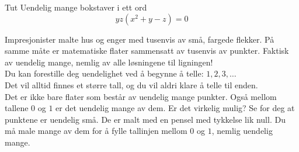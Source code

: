 \begin{surferPage}{Tut}
Uendelig mange bokstaver i ett ord\\
\smallskip
\[y z (x^2	+ y - z)	= 0\]

\vspace{0.3cm}
Impresjonister malte hus og enger med tusenvis av små, fargede flekker. På samme måte er matematiske flater sammensatt av tusenvis av punkter. Faktisk av uendelig mange, nemlig av alle løsningene til ligningen! \\
\vspace{0.3cm}
Du kan forestille deg uendelighet ved å begynne å telle:  $1, 2, 3,\dotsc$\\
Det vil alltid finnes et større tall, og du vil aldri klare å telle til enden.\\
\vspace{0.3cm}
Det er ikke bare flater som består av uendelig mange punkter. Også mellom tallene $0$ og $1$ er det uendelig mange av dem. Er det virkelig mulig? Se for deg at punktene er uendelig små. De er malt med en pensel med tykkelse lik null. Du må male mange av dem for å fylle tallinjen mellom $0$ og $1$, nemlig uendelig mange.
\end{surferPage}
